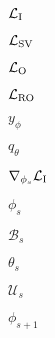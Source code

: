 $\mathcal{L}_{\rm I}$

$\mathcal{L}_{\rm SV}$

$\mathcal{L}_{\rm O}$

$\mathcal{L}_{\rm RO}$

$y_\phi$

$q_\theta$

$\nabla_{\phi_s}\mathcal{L}_{\rm I}$

$\phi_s$

$\mathcal{B}_s$

$\theta_s$

$\mathcal{U}_s$

$\phi_{s+1}$